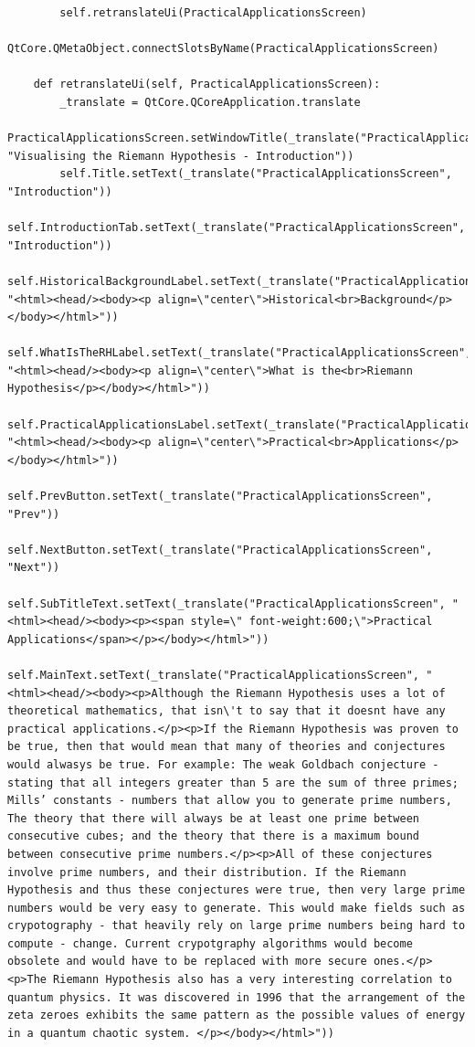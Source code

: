 \documentclass{article}
\begin{document}
\begin{lstlisting}
        self.retranslateUi(PracticalApplicationsScreen)
        QtCore.QMetaObject.connectSlotsByName(PracticalApplicationsScreen)

    def retranslateUi(self, PracticalApplicationsScreen):
        _translate = QtCore.QCoreApplication.translate
        PracticalApplicationsScreen.setWindowTitle(_translate("PracticalApplicationsScreen", "Visualising the Riemann Hypothesis - Introduction"))
        self.Title.setText(_translate("PracticalApplicationsScreen", "Introduction"))
        self.IntroductionTab.setText(_translate("PracticalApplicationsScreen", "Introduction"))
        self.HistoricalBackgroundLabel.setText(_translate("PracticalApplicationsScreen", "<html><head/><body><p align=\"center\">Historical<br>Background</p></body></html>"))
        self.WhatIsTheRHLabel.setText(_translate("PracticalApplicationsScreen", "<html><head/><body><p align=\"center\">What is the<br>Riemann Hypothesis</p></body></html>"))
        self.PracticalApplicationsLabel.setText(_translate("PracticalApplicationsScreen", "<html><head/><body><p align=\"center\">Practical<br>Applications</p></body></html>"))
        self.PrevButton.setText(_translate("PracticalApplicationsScreen", "Prev"))
        self.NextButton.setText(_translate("PracticalApplicationsScreen", "Next"))
        self.SubTitleText.setText(_translate("PracticalApplicationsScreen", "<html><head/><body><p><span style=\" font-weight:600;\">Practical Applications</span></p></body></html>"))
        self.MainText.setText(_translate("PracticalApplicationsScreen", "<html><head/><body><p>Although the Riemann Hypothesis uses a lot of theoretical mathematics, that isn\'t to say that it doesnt have any practical applications.</p><p>If the Riemann Hypothesis was proven to be true, then that would mean that many of theories and conjectures would alwasys be true. For example: The weak Goldbach conjecture - stating that all integers greater than 5 are the sum of three primes; Mills’ constants - numbers that allow you to generate prime numbers, The theory that there will always be at least one prime between consecutive cubes; and the theory that there is a maximum bound between consecutive prime numbers.</p><p>All of these conjectures involve prime numbers, and their distribution. If the Riemann Hypothesis and thus these conjectures were true, then very large prime numbers would be very easy to generate. This would make fields such as crypotography - that heavily rely on large prime numbers being hard to compute - change. Current crypotgraphy algorithms would become obsolete and would have to be replaced with more secure ones.</p><p>The Riemann Hypothesis also has a very interesting correlation to quantum physics. It was discovered in 1996 that the arrangement of the zeta zeroes exhibits the same pattern as the possible values of energy in a quantum chaotic system. </p></body></html>"))

\end{lstlisting}
\end{document}
